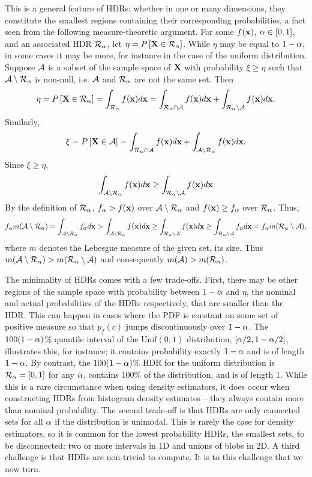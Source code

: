 This is a general feature of HDRs: whether in one or many dimensions, they constitute the smallest regions containing their corresponding probabilities, a fact seen from the following measure-theoretic argument. For some $f(\textbf{x})$, $\alpha \in [0, 1]$, and an associated HDR $\mathcal{R}_{\alpha}$, let $\eta = P\left[\textbf{X} \in \mathcal{R}_{\alpha}\right]$. While $\eta$ may be equal to $1 - \alpha$, in some cases it may be more, for instance in the case of the uniform distribution. %
Suppose $\mathcal{A}$ is a subset of the sample space of $\textbf{X}$ with probability $\xi \geq \eta$ such that $\mathcal{A} \setminus \mathcal{R}_{\alpha}$ is non-null, i.e.  $\mathcal{A}$ and $\mathcal{R}_{\alpha}$ are not the same set. Then
$$
\eta = P\left[\textbf{X} \in \mathcal{R}_{\alpha}\right]
= \int_{\mathcal{R}_{\alpha}}f(\textbf{x})d\textbf{x}
= \int_{\mathcal{R}_{\alpha} \cap \mathcal{A}}f(\textbf{x})d\textbf{x} + \int_{\mathcal{R}_{\alpha} \setminus \mathcal{A}}f(\textbf{x})d\textbf{x}.
$$
Similarly,
$$
\xi = P\left[\textbf{X} \in \mathcal{A}\right]
= \int_{\mathcal{R}_{\alpha} \cap \mathcal{A}}f(\textbf{x})d\textbf{x} + \int_{\mathcal{A} \setminus \mathcal{R}_{\alpha}}f(\textbf{x})d\textbf{x}.
$$
Since $\xi \geq \eta$,
$$
\int_{\mathcal{A} \setminus \mathcal{R}_{\alpha}}f(\textbf{x})d\textbf{x}
\geq
\int_{\mathcal{R}_{\alpha} \setminus \mathcal{A}}f(\textbf{x})d\textbf{x}
$$
By the definition of $\mathcal{R}_{\alpha}$, $f_{\alpha} > f(\textbf{x})$ over $\mathcal{A} \setminus \mathcal{R}_{\alpha}$ and $f(\textbf{x}) \geq f_{\alpha}$ over $\mathcal{R}_{\alpha}$.
Thus,
$$
  f_{\alpha} m(\mathcal{A} \setminus \mathcal{R}_{\alpha})
  = \int_{\mathcal{A} \setminus \mathcal{R}_{\alpha}}f_{\alpha}d\textbf{x}
  > \int_{\mathcal{A} \setminus \mathcal{R}_{\alpha}}f(\textbf{x})d\textbf{x}
  \geq \int_{\mathcal{R}_{\alpha} \setminus \mathcal{A}}f(\textbf{x})d\textbf{x}
  \geq \int_{\mathcal{R}_{\alpha} \setminus \mathcal{A}}f_{\alpha}d\textbf{x}
  = f_{\alpha} m(\mathcal{R}_{\alpha} \setminus \mathcal{A}),
$$
where $m$ denotes the Lebesgue measure of the given set, its size. Thus $m(\mathcal{A}\setminus \mathcal{R}_{\alpha}) > m(\mathcal{R}_{\alpha} \setminus \mathcal{A})$ and consequently $m(\mathcal{A}) > m(\mathcal{R}_{\alpha})$.

The minimality of HDRs comes with a few trade-offs.
First, there may be other regions of the sample space with probability between $1 - \alpha$ and $\eta$, the nominal and actual probabilities of the HDRs respectively, that are smaller than the HDR.
This can happen in cases where the PDF is constant on some set of positive measure so that $p_{f}(c)$ jumps discontinuously over $1 - \alpha$.
The $100(1-\alpha)$\% quantile interval of the $\mbox{Unif}(0,1)$ distribution, $[\alpha/2, 1-\alpha/2]$, illustrates this, for instance; it contains probability exactly $1-\alpha$ and is of length $1-\alpha$.
By contrast, the $100(1-\alpha)$\% HDR for the uniform distribution is $\mathcal{R}_{\alpha} = [0,1]$ for any $\alpha$, contains 100\% of the distribution, and is of length $1$.
While this is a rare circumstance when using density estimators, it does occur when constructing HDRs from histogram density estimates --
they always contain more than nominal probability.
The second trade-off is that HDRs are only connected sets for all $\alpha$ if the distribution is unimodal.
This is rarely the case for density estimators, so it is common for the lowest probability HDRs, the smallest sets, to be disconnected: two or more intervals in 1D and unions of blobs in 2D.
A third challenge is that HDRs are non-trivial to compute. It is to this challenge that we now turn.


